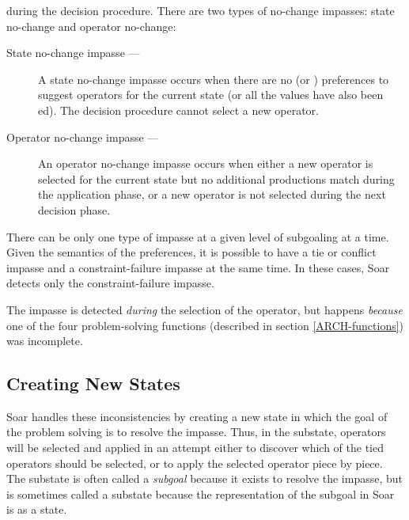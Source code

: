 \begin{description}
        during the decision procedure. There are two types of no-change
        impasses: state no-change and operator no-change:\vspace{-8pt} 
        \begin{description}
        \item[State no-change impasse ---] 
		A state no-change impasse occurs when there are no
		 (or ) preferences to suggest
		operators for the current state (or all the 
		values have also been ed). The decision procedure
		cannot select a new operator.\vspace{-8pt}
        \item[Operator no-change impasse ---] 
		An operator no-change impasse occurs when either a new operator 
                is selected for the current state but no additional productions
                match during the application phase, or a new
                operator is not selected during the next decision phase.
        \end{description}
\end{description}

There can be only one type of impasse at a given level of subgoaling at
a time. Given the semantics of the preferences, it is possible to have a
tie or conflict impasse and a constraint-failure impasse at the same
time.  In these cases, Soar detects only the constraint-failure impasse.

The impasse is detected \textit{during} the selection of the operator,
but happens \textit{because} one of the four problem-solving
functions (described in section \ref{ARCH-functions}) was incomplete.

\subsection{Creating New States}
Soar handles these inconsistencies by creating a new state in which the
goal of the problem solving is to resolve the impasse.  Thus, in the
substate, operators will be selected and applied in an attempt either to
discover which of the tied operators should be selected, or to apply the
selected operator piece by piece.  The substate is often called a
\emph{subgoal} because it exists to resolve the impasse, but is
sometimes called a substate because the representation of the subgoal in
Soar is as a state.

